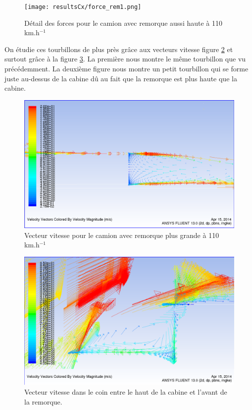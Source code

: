\begin{figure}[!h]
\centering
\texttt{[image: resultsCx/force\_rem1.png]}
\caption{Détail des forces pour le camion avec remorque aussi haute à 110 km.h$^{-1}$}
\label{figRem2Stream110}
\end{figure}

On étudie ces tourbillons de plus près grâce aux vecteurs vitesse figure \ref{figRem2Vit110} et surtout grâce à la figure \ref{figRem2Vit110-coin}. La première nous montre le même tourbillon que vu précédemment. La deuxième figure nous montre un petit tourbillon qui se forme juste au-dessus de la cabine dû au fait que la remorque est plus haute que la cabine.\\
\begin{figure}[!h]
\centering
\includegraphics[scale=0.4]{resultsCx/Remorque2-110_VelocityVectors.png}
\caption{Vecteur vitesse pour le camion avec remorque plus grande à 110 km.h$^{-1}$}
\label{figRem2Vit110}
\end{figure}
\begin{figure}[!h]
\centering
\includegraphics[scale=0.4]{resultsCx/remorque2-hautCabineAbsorption.png}
\caption{Vecteur vitesse dans le coin entre le haut de la cabine et l'avant de la remorque.}
\label{figRem2Vit110-coin}
\end{figure}
\clearpage

